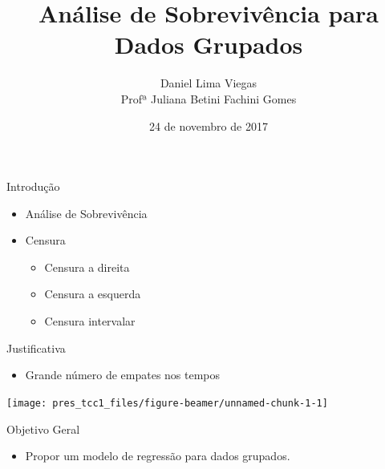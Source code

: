 \documentclass[ignorenonframetext,]{beamer}
\title{Análise de Sobrevivência para\\
Dados Grupados}
\author{Daniel Lima Viegas\\
Profª Juliana Betini Fachini Gomes}
\date{24 de novembro de 2017}
\providecommand{\tightlist}{%
  \setlength{\itemsep}{0pt}\setlength{\parskip}{0pt}}
\begin{document}
\frame{\titlepage}

\begin{frame}


\end{frame}

\begin{frame}{%
\protect\hypertarget{introducao}{%
Introdução}}

\begin{itemize}
\item
  Análise de Sobrevivência
\item
  Censura

  \begin{itemize}
  \tightlist
  \item
    Censura a direita
  \item
    Censura a esquerda
  \item
    Censura intervalar
  \end{itemize}
\end{itemize}

\end{frame}

\begin{frame}{%
\protect\hypertarget{justificativa}{%
Justificativa}}

\begin{itemize}
\tightlist
\item
  Grande número de empates nos tempos
\end{itemize}

\begin{center}\texttt{[image: pres\_tcc1\_files/figure-beamer/unnamed-chunk-1-1]} \end{center}

\end{frame}

\begin{frame}{%
\protect\hypertarget{objetivo-geral}{%
Objetivo Geral}}

\begin{itemize}
\tightlist
\item
  Propor um modelo de regressão para dados grupados.
\end{itemize}

\end{frame}
\end{document}
